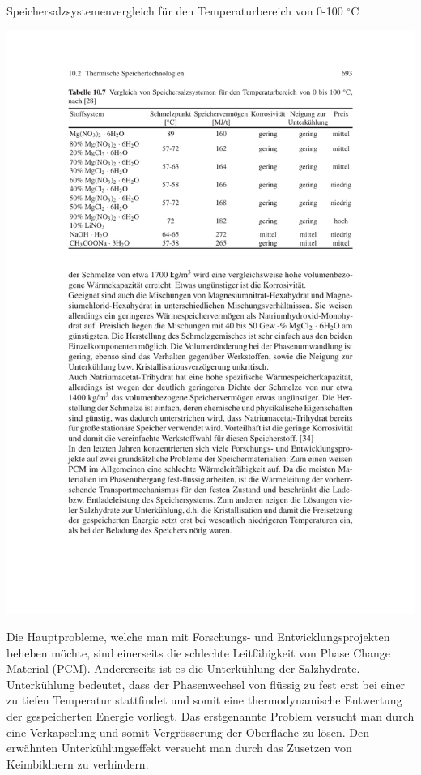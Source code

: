 \documentclass[11pt,a4paper]{scrartcl}
\begin{document}
\begin{table}[h!]
\begin{center}
\caption{Speichersalzsystemenvergleich für den Temperaturbereich von 0-100
$^\circ$C \cite{Wesselak}}
\includegraphics[scale=1]{images/speichersalze.pdf}
\label{tab:salz}
\end{center}
\end{table}
Die Hauptprobleme, welche man mit Forschungs- und Entwicklungsprojekten beheben
möchte, sind einerseits die schlechte Leitfähigkeit von Phase Change Material
(PCM). Andererseits ist es die Unterkühlung der Salzhydrate. Unterkühlung
bedeutet, dass der Phasenwechsel von flüssig zu fest erst bei einer zu tiefen
Temperatur stattfindet und somit eine thermodynamische Entwertung der
gespeicherten Energie vorliegt. Das erstgenannte Problem versucht man durch eine
Verkapselung und somit Vergrösserung der Oberfläche zu lösen. Den erwähnten
Unterkühlungseffekt versucht man durch das Zusetzen von Keimbildnern zu
verhindern.
\end{document}
